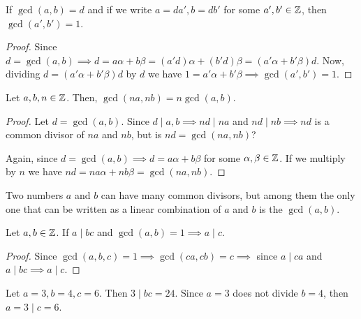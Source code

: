 \begin{prop}
    If $\gcd\left( a, b \right) = d$ and if we write $a = da', b = db'$ for some $a', b'\in\mathbb{Z}$, then
    $\gcd\left( a', b' \right) = 1$.
\end{prop}

\begin{proof}
    Since $d = \gcd\left( a, b \right) \implies d = a\alpha + b\beta = \left( a'd \right) \alpha + \left(
    b'd\right)\beta = \left( a'\alpha + b'\beta \right) d$. Now, dividing $d = \left( a'\alpha + b'\beta
    \right)d$ by $d$ we have $1 = a'\alpha + b'\beta\implies \gcd\left( a', b' \right) = 1$.
\end{proof}

\begin{prop}
    Let $a, b, n\in\mathbb{Z}$. Then, $\gcd\left( na, nb \right) = n\gcd\left( a, b \right) $.
\end{prop}

\begin{proof}
    Let $d = \gcd\left( a, b \right) $. Since $d\mid a, b\implies nd\mid na$ and $nd\mid nb\implies
    nd$ is a common divisor of $na$ and $nb$, but is $nd = \gcd\left( na, nb \right)$?

    Again, since $d = \gcd\left( a, b \right) \implies d = a\alpha + b\beta$ for some $\alpha, \beta\in\mathbb{Z}$.
    If we multiply by $n$ we have $nd = na\alpha + nb\beta = \gcd\left( na, nb \right) $.
\end{proof}

\begin{remark}
    Two numbers $a$ and $b$ can have many common divisors, but among them the only one that can be
    written as a linear combination of $a$ and $b$ is the $\gcd\left( a, b \right) $.
\end{remark}

\begin{theorem}
    Let $a, b\in\mathbb{Z}$. If $a\mid bc$ and $\gcd\left( a, b \right) = 1\implies
    a\mid c$.
\end{theorem}

\begin{proof}
    Since $\gcd\left( a, b, c \right) = 1\implies\gcd\left( ca, cb \right) = c\implies$ since $a\mid ca$ and
    $a\mid bc\implies a\mid c$.
\end{proof}

\begin{example}
    Let $a = 3, b = 4, c = 6$. Then $3\mid bc = 24$. Since $a = 3$ does not divide $b = 4$, then $ a = 3\mid
    c = 6$.
\end{example}

